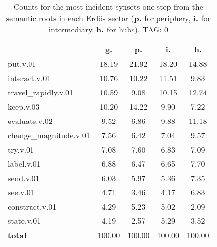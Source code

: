 \begin{table}[h!]
\begin{center}
\begin{tabular}{| l || c | c | c | c |}\hline
 & {\bf g.} & {\bf p.} & {\bf i.} & {\bf h.} \\\hline\hline
put.v.01 & 18.19  & 21.92  & 18.20  & 14.88 \\\hline
interact.v.01 & 10.76  & 10.22  & 11.51  & 9.83 \\\hline
travel\_rapidly.v.01 & 10.59  & 9.08  & 10.15  & 12.74 \\\hline
keep.v.03 & 10.20  & 14.22  & 9.90  & 7.22 \\\hline
evaluate.v.02 & 9.52  & 6.86  & 9.88  & 11.18 \\\hline
change\_magnitude.v.01 & 7.56  & 6.42  & 7.04  & 9.57 \\\hline
try.v.01 & 7.08  & 7.60  & 6.83  & 7.09 \\\hline
label.v.01 & 6.88  & 6.47  & 6.65  & 7.70 \\\hline
send.v.01 & 6.03  & 5.97  & 5.36  & 7.35 \\\hline
see.v.01 & 4.71  & 3.46  & 4.17  & 6.83 \\\hline
construct.v.01 & 4.29  & 5.23  & 5.02  & 2.09 \\\hline
state.v.01 & 4.19  & 2.57  & 5.29  & 3.52 \\\hline\hline
{{\bf total}} & 100.00  & 100.00  & 100.00  & 100.00 \\\hline
\end{tabular}
\caption{Counts for the most incident synsets one step from the semantic roots in each Erd\"os sector ({\bf p.} for periphery, {\bf i.} for intermediary, {\bf h.} for hubs). TAG: 0}
\end{center}
\end{table}